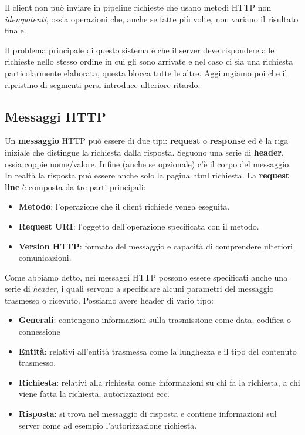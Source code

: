 Il client non può inviare in pipeline richieste che usano metodi HTTP non \emph{idempotenti}, ossia
operazioni che, anche se fatte più volte, non variano il risultato finale.

Il problema principale di questo sistema è che il server deve rispondere alle richieste nello
stesso ordine in cui gli sono arrivate e nel caso ci sia una richiesta particolarmente elaborata,
questa blocca tutte le altre. Aggiungiamo poi che il ripristino di segmenti persi introduce
ulteriore ritardo.

\subsection{Messaggi HTTP}
Un \textbf{messaggio} HTTP può essere di due tipi: \textbf{request} o \textbf{response} ed è la
riga iniziale che distingue la richiesta dalla risposta. Seguono una serie di \textbf{header},
ossia coppie nome/valore. Infine (anche se opzionale) c'è il corpo del messaggio. In realtà
la risposta può essere anche solo la pagina html richiesta. La \textbf{request line} è composta da
tre parti principali:
\begin{itemize}
	\item \textbf{Metodo}: l'operazione che il client richiede venga eseguita.
	\item \textbf{Request URI}: l'oggetto dell'operazione specificata con il metodo.
	\item \textbf{Version HTTP}: formato del messaggio e capacità di comprendere ulteriori
		comunicazioni.
\end{itemize}
Come abbiamo detto, nei messaggi HTTP possono essere specificati anche una serie di \emph{header},
i quali servono a specificare alcuni parametri del messaggio trasmesso o ricevuto. Possiamo avere 
header di vario tipo:
\begin{itemize}
	\item \textbf{Generali}: contengono informazioni sulla trasmissione come data, codifica o
		connessione
	\item \textbf{Entità}: relativi all'entità trasmessa come la lunghezza e il tipo del contenuto
		trasmesso.
	\item \textbf{Richiesta}: relativi alla richiesta come informazioni su chi fa la richiesta, a 
		chi viene fatta la richiesta, autorizzazioni ecc.
	\item \textbf{Risposta}: si trova nel messaggio di risposta e contiene informazioni sul server
		come ad esempio l'autorizzazione richiesta.
\end{itemize}
